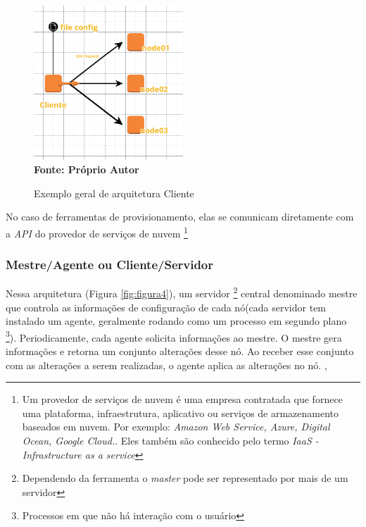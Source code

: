 \begin{figure}[ht]
	\centering	
	\caption[\hspace{0.1cm}Exemplo arquitetura Cliente]{Exemplo geral de arquitetura Cliente}
	\vspace{-0.4cm}
	\includegraphics[width=0.5\textwidth]{figuras/cliente.png}
	 \vspace{-0.2cm}
	\\\textbf{\footnotesize Fonte: Próprio Autor}
	\label{fig:figura3}
\end{figure}
\vspace{-0.5cm}


No caso de ferramentas de provisionamento, elas se comunicam diretamente com a \textit{API} do provedor de serviços de nuvem \footnote{Um provedor de serviços de nuvem é uma empresa contratada que fornece uma plataforma, infraestrutura, aplicativo ou serviços de armazenamento baseados em nuvem. Por exemplo: \textit{Amazon Web Service, Azure, Digital Ocean, Google Cloud.}. Eles também são conhecido pelo termo \textit{IaaS - Infrastructure as a service} }


\subsubsection{Mestre/Agente ou Cliente/Servidor} \label{cliente-servidor}
 
  Nessa arquitetura (Figura \ref{fig:figura4}), um servidor \footnote{Dependendo da ferramenta o \textit{master} pode ser representado por mais de um servidor} central denominado mestre que controla as informações de configuração de cada nó(cada servidor tem instalado  um agente, geralmente rodando como um processo em segundo plano \footnote{Processos em que não há interação com o usuário}). Periodicamente, cada agente solicita informações ao mestre. O mestre gera informações e retorna um conjunto alterações desse nó. Ao receber esse conjunto com as alterações a serem realizadas, o agente aplica as alterações no nó. \cite{puppetlabs}, 
 
